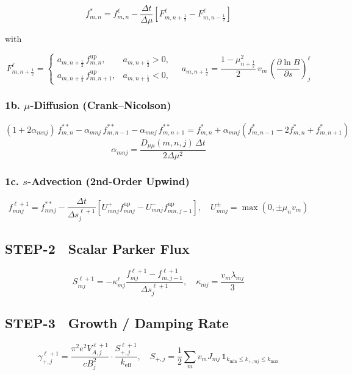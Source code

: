 {\[
f_{m,n}^{*} = f_{m,n}^{\ell}
- \frac{\Delta t}{\Delta \mu}
  \left[ F_{m,n+\frac{1}{2}}^{\ell} - F_{m,n-\frac{1}{2}}^{\ell} \right]
\]

with

\[
F_{m,n+\frac{1}{2}}^{\ell} =
\begin{cases}
a_{m,n+\frac{1}{2}}\, f_{m,n}^{\text{up}}, & a_{m,n+\frac{1}{2}} > 0, \\[4pt]
a_{m,n+\frac{1}{2}}\, f_{m,n+1}^{\text{up}}, & a_{m,n+\frac{1}{2}} < 0,
\end{cases}
\quad
a_{m,n+\frac{1}{2}} = \frac{1 - \mu_{n+\frac{1}{2}}^2}{2}\, v_m\,
\left( \frac{\partial \ln B}{\partial s} \right)_j^{\ell}
\]

\subsubsection*{1b. $\mu$-Diffusion (Crank–Nicolson)}

\[
(1 + 2\alpha_{mnj})\, f_{m,n}^{**}
- \alpha_{mnj}\, f_{m,n-1}^{**}
- \alpha_{mnj}\, f_{m,n+1}^{**}
= f_{m,n}^{*}
+ \alpha_{mnj} \left(f_{m,n-1}^{*} - 2f_{m,n}^{*} + f_{m,n+1}^{*} \right)
\]
\[
\alpha_{mnj} = \frac{D_{\mu\mu}(m,n,j)\,\Delta t}{2\Delta\mu^2}
\]

\subsubsection*{1c. $s$-Advection (2nd-Order Upwind)}

\[
f_{mnj}^{\ell+1} = f_{mnj}^{**}
- \frac{\Delta t}{\Delta s_j^{\ell+1}}
\left[ U_{mnj}^{+} f_{mnj}^{\text{up}} - U_{mnj}^{-} f_{mn,j-1}^{\text{up}} \right],
\quad
U_{mnj}^{\pm} = \max(0, \pm \mu_n v_m)
\]

\subsection*{STEP-2 Scalar Parker Flux}

\[
S_{mj}^{\ell+1} = -\kappa_{mj}^{\ell}
\frac{f_{mj}^{\ell+1} - f_{m,j-1}^{\ell+1}}{\Delta s_j^{\ell+1}},
\quad
\kappa_{mj} = \frac{v_m \lambda_{mj}}{3}
\]

\subsection*{STEP-3 Growth / Damping Rate}

\[
\gamma_{+,j}^{\ell+1} =
\frac{\pi^2 e^2 V_{A,j}^{\ell+1}}{c B_j^2}
\cdot \frac{S_{+,j}^{\ell+1}}{k_{\text{eff}}},
\quad
S_{+,j} = \frac{1}{2} \sum_m v_m J_{mj} \,\mathbb{1}_{k_{\min} \le k_{+,mj} \le k_{\max}}
\]

}
